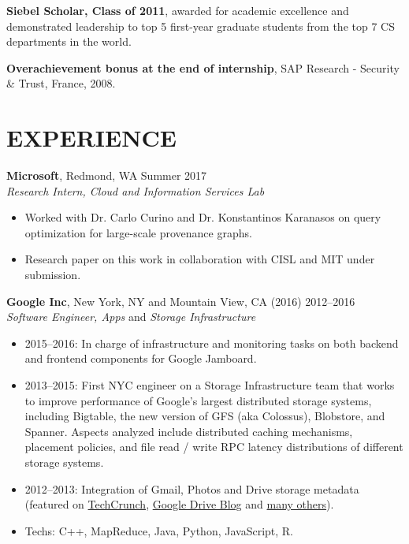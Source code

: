 \documentclass[line,margin]{res}
\begin{document}
\begin{resume}
\textbf{Siebel Scholar, Class of 2011}, awarded for academic excellence and demonstrated leadership to top 5 first-year graduate students from the top 7 CS departments in the world.

\textbf{Overachievement bonus at the end of internship}, SAP Research - Security \& Trust, France, 2008.



\section{EXPERIENCE}
                \textbf{Microsoft}, Redmond, WA \hfill Summer 2017 \\
                {\sl Research Intern, Cloud and Information Services Lab}
                \begin{itemize}
                \item Worked with Dr. Carlo Curino and Dr. Konstantinos Karanasos on query optimization for large-scale provenance graphs.
                \item Research paper on this work in collaboration with CISL and MIT under submission.
                \end{itemize}

                \textbf{Google Inc}, New York, NY and Mountain View, CA (2016) \hfill 2012--2016 \\
                {\sl Software Engineer, Apps} and {\sl Storage Infrastructure}
                \begin{itemize}  \itemsep -2pt
                \item  2015--2016: In charge of infrastructure and monitoring tasks on both backend and frontend components for Google Jamboard.
                \item  2013--2015: First NYC engineer on a Storage Infrastructure team that works to improve 
                performance of Google's largest distributed storage systems, including Bigtable, the new 
                version of GFS (aka Colossus), Blobstore, and Spanner.  Aspects analyzed include 
                distributed caching mechanisms, placement policies, and file read / write RPC latency 
                distributions of different storage systems.
		\item 2012--2013: Integration of Gmail, Photos and Drive storage metadata (featured on 
		\href{http://goo.gl/y8cpvZ}{TechCrunch}, \href{http://googledrive.blogspot.com/2013/05/bringing-it-all-together-15-gb-now.html}{Google Drive Blog}
		and \href{https://www.google.com/search?q=google\%20unifies\%20drive\%20gmail\%20google\%20photos\%2015gb}{many others}).
		\item Techs: C++, MapReduce, Java, Python, JavaScript, R.
                \end{itemize}
                

\end{resume}
\end{document}
